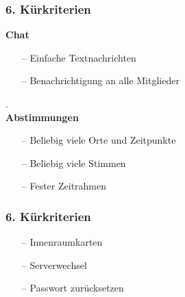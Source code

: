 \documentclass[aspectratio=1610]{beamer}
\begin{document}
\begin{frame}[plain]
\frametitle{6. Kürkriterien}
\begin{minipage}{0.5\textwidth}
	\setlength{\fboxsep}{0pt}%
	\setlength{\fboxrule}{1pt}%
	\captionsetup{labelformat=empty}
	\centering
\end{minipage}%
\begin{minipage}{0.5\textwidth}
	\textbf{Chat}
	\begin{itemize}
		\setlength\itemsep{0.3em}
		\item[--] Einfache Textnachrichten
		\item[--] Benachrichtigung an alle Mitglieder
	\end{itemize} 
.\\ \textbf{Abstimmungen}
\begin{itemize}
	\setlength\itemsep{0.3em}
	\item[--] Beliebig viele Orte und Zeitpunkte
	\item[--] Beliebig viele Stimmen
	\item[--] Fester Zeitrahmen
\end{itemize}
\end{minipage}
\end{frame}

\begin{frame}[plain]
	\frametitle{6. Kürkriterien}
	\begin{itemize}
		\setlength\itemsep{0.3em}
		\item[--] Innenraumkarten
		\item[--] Serverwechsel
		\item[--] Passwort zurücksetzen
	\end{itemize}
\end{frame}
\end{document}
